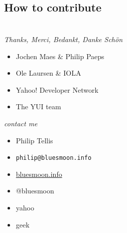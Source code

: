 \documentclass{beamer}
\begin{document}
\subsection{How to contribute}

\section{}
\begin{frame}{\textit{Thanks, Merci, Bedankt, Danke Schön}}
  \begin{itemize}
  \item Jochen Maes \& Philip Paeps
  \item Ole Laursen \& IOLA
  \item Yahoo! Developer Network
  \item The YUI team
  \end{itemize}
\end{frame}

\begin{frame}{\textit{contact me}}
  \begin{itemize}
  \item Philip Tellis
  \item \small{\texttt{philip@bluesmoon.info}}
  \item \href{http://bluesmoon.info/}{bluesmoon.info}
  \item @bluesmoon
  \item yahoo
  \item geek
  \end{itemize}
\end{frame}
\end{document}

